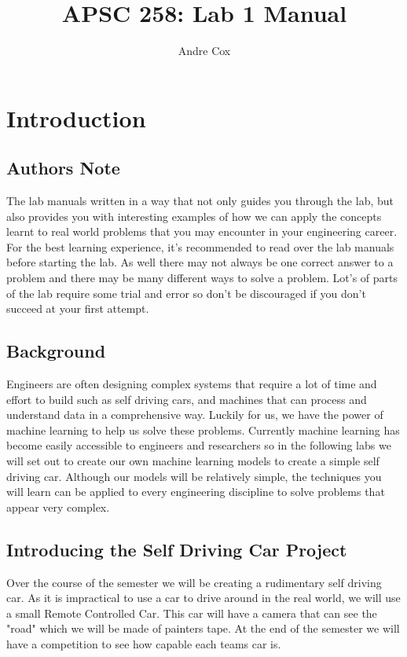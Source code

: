 \documentclass[11pt]{report}
\title{APSC 258: Lab 1 Manual}
\author{Andre Cox}
\begin{document}
    \maketitle
    \tableofcontents

    \clearpage

    \chapter{Introduction}

    \section{Authors Note}
    The lab manuals written in a way that not only guides you through the lab, but also provides you with interesting examples of how we can apply the concepts learnt to real world problems that you may encounter in your engineering career. For the best learning experience, it's recommended to read over the lab manuals before starting the lab.
    As well there may not always be one correct answer to a problem and there may be many different ways to solve a problem. Lot's of parts of the lab require some trial and error so don't be discouraged if you don't succeed at your first attempt.


    \section{Background}
    Engineers are often designing complex systems that require a lot of time and effort to build such as self driving cars, and machines that can process and understand data in a comprehensive way.
    Luckily for us, we have the power of machine learning to help us solve these problems. Currently machine learning has become easily accessible to engineers and researchers so in the following labs we will set out to create our own machine learning models to create a simple self driving car.
    Although our models will be relatively simple, the techniques you will learn can be applied to every engineering discipline to solve problems that appear very complex.

    \section{Introducing the Self Driving Car Project}
    Over the course of the semester we will be creating a rudimentary self driving car. As it is impractical to use a car to drive around in the real world, we will use a small Remote Controlled Car. This car will have a camera that can see the "road" which we will be made of painters tape. At the end of the semester we will have a competition to see how capable each teams car is.
\end{document}
